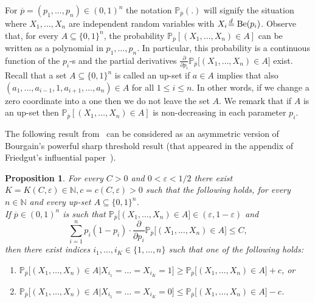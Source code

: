 \documentclass[11pt]{article}%
\newtheorem{proposition}[proposition]{Proposition}
\newcommand{\eN}[0]{\ensuremath{ \mathbb N}}
\newcommand{\Pee}[0]{\ensuremath{{\mathbb P}}}
\newcommand{\isd}[0]{\hspace{.2ex} \raisebox{-.1ex}{$=$} \hspace{-1.5ex} 
\raisebox{1ex}{{$\scriptstyle d$}} \hspace{.8ex} }
\newcommand{\eps}{\varepsilon}
\DeclareMathOperator{\Be}{Be}
\begin{document}
For $\overline{p} = (p_1,\dots, p_n) \in (0,1)^n$ the notation $\Pee_{\overline{p}}(.)$ will 
signify the situation where $X_1, \dots, X_n$ are independent random variables with 
$X_i \isd \Be(p_i)$.
Observe that, for every $A \subseteq \{0,1\}^n$, the probability
$\Pee_{\overline{p}}[ (X_1,\dots, X_n ) \in A ]$ can be written as a
polynomial in $p_1,\dots, p_n$.
In particular, this probability is a continuous function of the 
$p_i$-s and the partial derivatives $\frac{\partial}{\partial p_i}\Pee_{\overline{p}}{\big[} (X_1,\dots, X_n) \in A {\big]}$
exist.
Recall that a set $A \subseteq \{0,1\}^n$ is called an up-set if 
$a \in A$ implies that also $(a_1,\dots,a_{i-1},1,a_{i+1},\dots,a_n) \in A$ for all $1\leq i \leq n$.
In other words, if we change a zero coordinate into a one then we do not leave the set $A$.
We remark that if $A$ is an up-set then $\Pee_{\overline{p}}[ (X_1,\dots, X_n ) \in A ]$ is non-decreasing 
in each parameter $p_i$.

The following result from~\cite{MullerConfetti} can be considered as an asymmetric version 
of Bourgain's powerful sharp threshold result (that appeared in the appendix of Friedgut's influential paper~\cite{Friedgut99}).

\begin{proposition}\label{prop:BourTobias}\cite{MullerConfetti}
 For every $C > 0$ and $0 < \eps < 1/2$ there exist $K = K(C,\eps) \in\eN, c = c(C,\eps) > 0$ such that
 the following holds, for every $n \in \eN$ and every up-set $A \subseteq \{0,1\}^n$. \\
 If $\overline{p} \in (0,1)^n$ is such that $\Pee_{\overline{p}}{\big[ }(X_1,\dots, X_n) \in A {\big]} \in (\eps,1-\eps)$
and 
\[  \sum_{i=1}^n p_i(1-p_i) \cdot \frac{\partial}{\partial p_i}\Pee_{\overline{p}}{\big[} (X_1,\dots, X_n) \in A {\big]} \leq C, 
 \]%
%
then there exist indices $i_1, \dots, i_K \in \{1,\dots, n\}$ such that one of the following holds:
\begin{enumerate}
 \item[{\bf(a)}] $\Pee_{\overline{p}}{\big[} (X_1, \dots, X_n) \in A {\big|} X_{i_1} = \dots = X_{i_K} = 1 {\big]}
 \geq \Pee_{\overline{p}}{\big[} (X_1, \dots, X_n) \in A {\big]} + c$, or
 \item[{\bf(b)}] $\Pee_{\overline{p}}{\big[} (X_1, \dots, X_n) \in A {\big|} X_{i_1} = \dots = X_{i_K} = 0 {\big]}
 \leq \Pee_{\overline{p}}{\big[} (X_1, \dots, X_n) \in A {\big]} - c$.
\end{enumerate}
\end{proposition}
\end{document}
